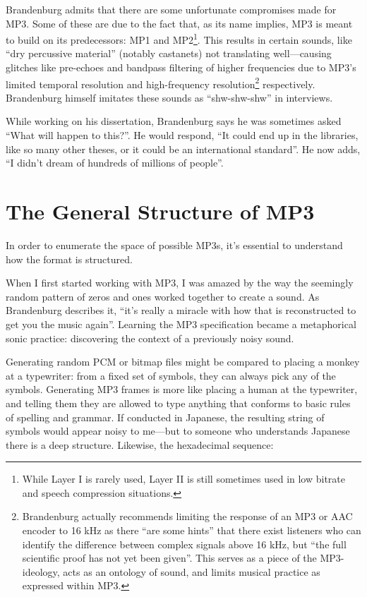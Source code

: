 \documentclass{thesis}
\begin{document}
Brandenburg admits that there are some unfortunate compromises made for MP3. Some of these are due to the fact that, as its name implies, MP3 is meant to build on its predecessors: MP1 and MP2\footnote{While Layer I is rarely used, Layer II is still sometimes used in low bitrate and speech compression situations.}. This results in certain sounds, like ``dry percussive material'' (notably castanets) not translating well\cite{karlheinz_brandenburg_mp3_1999}---causing glitches like pre-echoes and bandpass filtering of higher frequencies due to MP3's limited temporal resolution and high-frequency resolution\footnote{Brandenburg actually recommends limiting the response of an MP3 or AAC encoder to 16 kHz as there ``are some hints'' that there exist listeners who can identify the difference between complex signals above 16 kHz, but ``the full scientific proof has not yet been given''.\cite[10]{karlheinz_brandenburg_mp3_1999} This serves as a piece of the MP3-ideology, acts as an ontology of sound, and limits musical practice as expressed within MP3.} respectively. Brandenburg himself imitates these sounds as ``shw-shw-shw'' in interviews.

While working on his dissertation, Brandenburg says he was sometimes asked ``What will happen to this?''. He would respond, ``It could end up in the libraries, like so many other theses, or it could be an international standard''. He now adds, ``I didn't dream of hundreds of millions of people''.
	
\section{The General Structure of MP3}

In order to enumerate the space of possible MP3s, it's essential to understand how the format is structured.

When I first started working with MP3, I was amazed by the way the seemingly random pattern of zeros and ones worked together to create a sound. As Brandenburg describes it, ``it's really a miracle with how that is reconstructed to get you the music again''\cite{tom_merritt_real_2010}. Learning the MP3 specification became a metaphorical sonic practice: discovering the context of a previously noisy sound.

Generating random PCM or bitmap files might be compared to placing a monkey at a typewriter: from a fixed set of symbols, they can always pick any of the symbols. Generating MP3 frames is more like placing a human at the typewriter, and telling them they are allowed to type anything that conforms to basic rules of spelling and grammar. If conducted in Japanese, the resulting string of symbols would appear noisy to me---but to someone who understands Japanese there is a deep structure. Likewise, the hexadecimal sequence:
	
\end{document}
